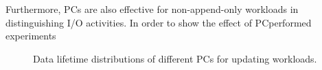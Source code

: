 Furthermore, PCs are also effective for non-append-only workloads
in distinguishing I/O activities. 
In order to show the effect of PCperformed experiments 

\begin{figure}[t]
\centering
\hfill
	\hspace{2pt}
\hfill
\vspace{7pt}
	\hspace{2pt}
\caption{Data lifetime distributions of different PCs for updating workloads.} 
\label{fig:types_and_PCs}
\end{figure}


